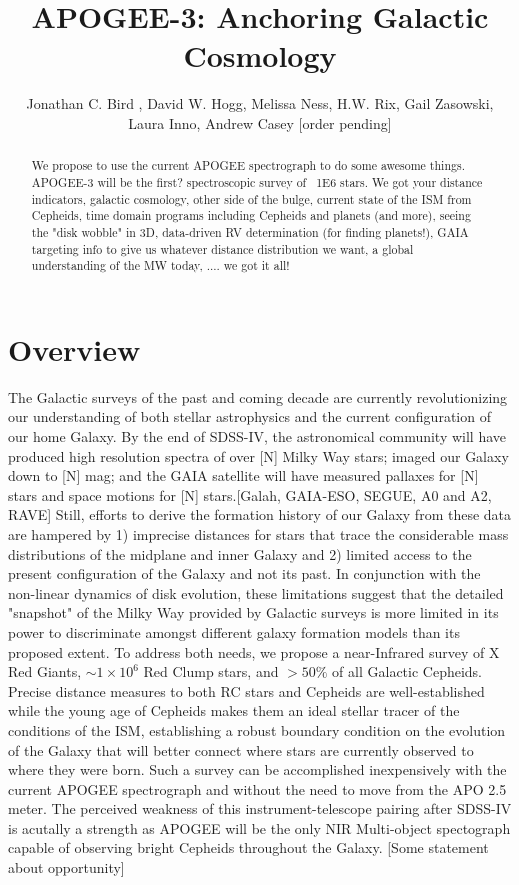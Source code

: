 \documentclass[11pt,preprint]{aastex}
\begin{document}
\title{APOGEE-3: Anchoring Galactic Cosmology}

\author{Jonathan C. Bird , David W. Hogg, Melissa Ness, H.W. Rix, Gail Zasowski, Laura Inno, Andrew Casey [order pending]}


\begin{abstract}
We propose to use the current APOGEE spectrograph to do some awesome things. APOGEE-3 will be the first? spectroscopic survey of ~1E6 stars. We got your distance indicators, galactic cosmology, other side of the bulge, current state of the ISM from Cepheids, time domain programs including Cepheids and planets (and more), seeing the "disk wobble" in 3D, data-driven RV determination (for finding planets!), GAIA targeting info to give us whatever distance distribution we want, a global understanding of the MW today, .... we got it all!
\end{abstract}

\section{Overview}
The Galactic surveys of the past and coming decade are currently revolutionizing our understanding of both stellar astrophysics and the current configuration of our home Galaxy. By the end of SDSS-IV, the astronomical community will have produced high resolution spectra of over [N] Milky Way stars; imaged our Galaxy down to [N] mag; and the GAIA satellite will have measured pallaxes for [N] stars and space motions for [N] stars.[Galah, GAIA-ESO, SEGUE, A0 and A2, RAVE] Still, efforts to derive the formation history of our Galaxy from these data are hampered by 1) imprecise distances for stars that trace the considerable mass distributions of the midplane and inner Galaxy and 2) limited access to the present configuration of the Galaxy and not its past. In conjunction with the non-linear dynamics of disk evolution, these limitations suggest that the detailed "snapshot" of the Milky Way provided by Galactic surveys is more limited in its power to discriminate amongst different galaxy formation models than its proposed extent. To address both needs, we propose a near-Infrared survey of X Red Giants, $\sim 1\times10^6$ Red Clump stars, and $>50\%$ of all Galactic Cepheids. Precise distance measures to both RC stars and Cepheids are well-established while the young age of Cepheids makes them an ideal stellar tracer of the conditions of the ISM, establishing a robust boundary condition on the evolution of the Galaxy that will better connect where stars are currently observed to where they were born. Such a survey can be accomplished inexpensively with the current APOGEE spectrograph and without the need to move from the APO 2.5 meter. The perceived weakness of this instrument-telescope pairing after SDSS-IV is acutally a strength as APOGEE will be the only NIR Multi-object spectograph capable of observing bright Cepheids throughout the Galaxy. [Some statement about opportunity]
\end{document}
